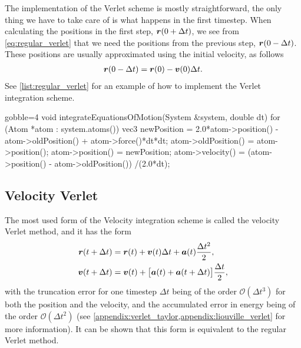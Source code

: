 The implementation of the Verlet scheme is mostly straightforward, the only thing we have to take care of is what happens in the first timestep. When calculating the positions in the first step, $\boldsymbol{r}(0+\Delta t)$, we see from \cref{eq:regular_verlet} that we need the positions from the previous step, $\boldsymbol{r}(0-\Delta t)$. These positions are usually approximated using the initial velocity, as follows
\begin{align*}
    \boldsymbol{r}(0-\Delta t) = \boldsymbol{r}(0) - \boldsymbol{v}(0)\Delta t.
\end{align*}
See \cref{list:regular_verlet} for an example of how to implement the Verlet integration scheme.
%
\begin{listing}[!htb]%
\begin{cppcode*}{gobble=4}
    void integrateEquationsOfMotion(System &system, double dt) {
        for (Atom *atom : system.atoms()) {
            vec3 newPosition = 2.0*atom->position() - atom->oldPosition() 
                               + atom->force()*dt*dt;
            atom->oldPosition() = atom->position();
            atom->position() = newPosition;
            atom->velocity() = (atom->position() - atom->oldPosition())
                               /(2.0*dt);
        }
    }
\end{cppcode*}
\caption{%
    Implentation of  from \cref{list:simple_md_program}, using regular Verlet integration.%
    \label{list:regular_verlet}%
}%
\end{listing}%

\subsection{Velocity Verlet}
The most used form of the Velocity integration scheme is called the velocity Verlet method\cite{swope1982computer}, and it has the form
\begin{align}
    \boldsymbol{r}(t + \Delta t) &= \boldsymbol{r}(t) + \boldsymbol{v}(t)\Delta t + \boldsymbol{a}(t)\frac{\Delta t^2}{2}, \label{eq:velocity_verlet_position}\\
    \boldsymbol{v}(t + \Delta t) &= \boldsymbol{v}(t) + \big[\boldsymbol{a}(t) + \boldsymbol{a}(t + \Delta t)\big] \frac{\Delta t}{2}, \label{eq:velocity_verlet_velocity}
\end{align}
with the truncation error for one timestep $\Delta t$ being of the order $\mathcal{O}(\Delta t^3)$ for both the position and the velocity, and the accumulated error in energy being of the order $\mathcal{O}(\Delta t^2)$ (see \cref{appendix:verlet_taylor,appendix:liouville_verlet} for more information). It can be shown that this form is equivalent to the regular Verlet method.

